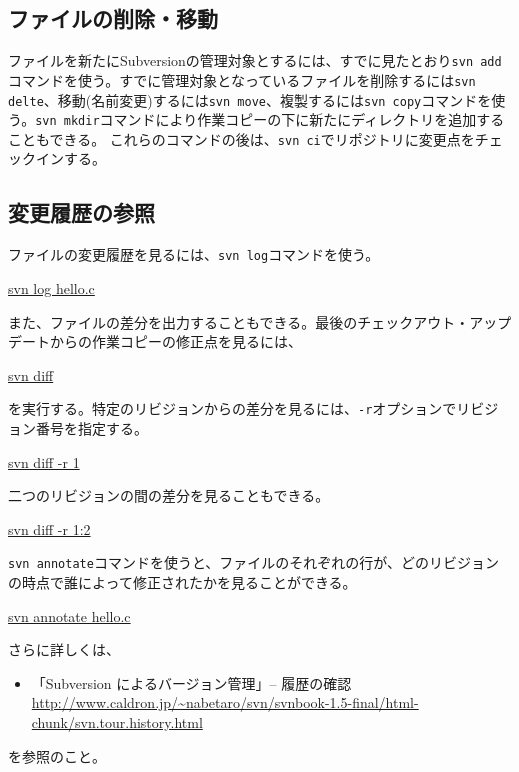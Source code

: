 \subsection{ファイルの削除・移動}

ファイルを新たにSubversionの管理対象とするには、すでに見たとおり{\tt svn add}コマンドを使う。すでに管理対象となっているファイルを削除するには{\tt svn delte}、移動(名前変更)するには{\tt svn move}、複製するには{\tt svn copy}コマンドを使う。{\tt svn mkdir}コマンドにより作業コピーの下に新たにディレクトリを追加することもできる。
これらのコマンドの後は、{\tt svn ci}でリポジトリに変更点をチェックインする。

\subsection{変更履歴の参照}

ファイルの変更履歴を見るには、{\tt svn log}コマンドを使う。
\begin{commandline2}
\prompt \underline{svn log hello.c}
\end{commandline2} \noindent
また、ファイルの差分を出力することもできる。最後のチェックアウト・アップデートからの作業コピーの修正点を見るには、
\begin{commandline2}
\prompt \underline{svn diff}
\end{commandline2} \noindent
を実行する。特定のリビジョンからの差分を見るには、{\tt -r}オプションでリビジョン番号を指定する。
\begin{commandline2}
\prompt \underline{svn diff -r 1}
\end{commandline2} \noindent
二つのリビジョンの間の差分を見ることもできる。
\begin{commandline2}
\prompt \underline{svn diff -r 1:2}
\end{commandline2} \noindent
{\tt svn annotate}コマンドを使うと、ファイルのそれぞれの行が、どのリビジョンの時点で誰によって修正されたかを見ることができる。
\begin{commandline2}
\prompt \underline{svn annotate hello.c}
\end{commandline2} \noindent
さらに詳しくは、
\begin{itemize}
  \item 「Subversion によるバージョン管理」-- 履歴の確認 \\
    {\small \url{http://www.caldron.jp/~nabetaro/svn/svnbook-1.5-final/html-chunk/svn.tour.history.html}}
\end{itemize}
を参照のこと。

